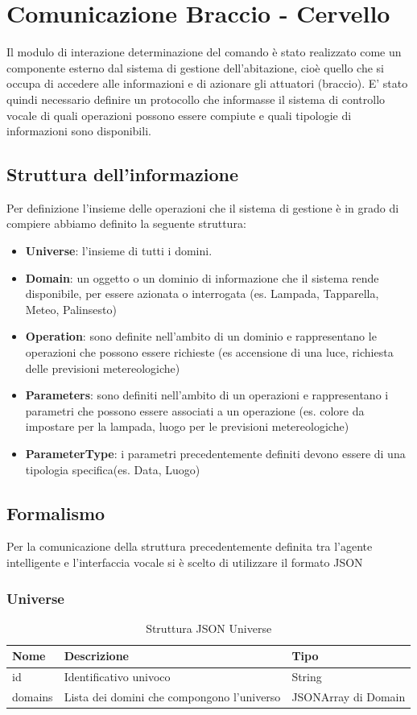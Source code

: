 \documentclass[twoside]{supsistudent}
\begin{document}
\chapter{Comunicazione Braccio - Cervello }
Il modulo di interazione determinazione del comando è stato realizzato come un componente esterno dal sistema di gestione dell'abitazione, cioè quello che si occupa di accedere alle informazioni e di azionare gli attuatori (braccio). E' stato quindi necessario definire un protocollo che informasse il sistema di controllo vocale di quali operazioni possono essere compiute e quali tipologie di informazioni sono disponibili.
\section{Struttura dell'informazione}
Per definizione l'insieme delle operazioni che il sistema di gestione è in grado di compiere abbiamo definito la seguente struttura:
\begin{itemize}
	\item \textbf{Universe}: l'insieme di tutti i domini.
	\item \textbf{Domain}: un oggetto o un dominio di informazione che il sistema rende disponibile, per essere azionata o interrogata (es. Lampada, Tapparella, Meteo, Palinsesto)
	\item \textbf{Operation}: sono definite nell'ambito di un dominio e rappresentano le operazioni che possono essere richieste (es accensione di una luce, richiesta delle previsioni metereologiche)
	\item \textbf{Parameters}: sono definiti nell'ambito di un operazioni e rappresentano i parametri che possono essere associati a un operazione (es. colore da impostare per la lampada, luogo per le previsioni metereologiche)
	\item \textbf{ParameterType}: i parametri precedentemente definiti devono essere di una tipologia specifica(es. Data, Luogo)
\end{itemize}

\section{Formalismo}
Per la comunicazione della struttura precedentemente definita tra l'agente intelligente e l'interfaccia vocale si è scelto di utilizzare il formato JSON

\subsection{Universe}
\begin{table}[H]
\centering
\caption{Struttura JSON Universe}
\label{Struttura JSON Universe}
\begin{tabular}{@{}|l|l|l|@{}}
\toprule
Nome    & Descrizione                                & Tipo                \\ \midrule
id      & Identificativo univoco                     & String             \\ \midrule
domains & Lista dei domini che compongono l'universo & JSONArray di Domain \\ \bottomrule
\end{tabular}
\end{table}
\end{document}
